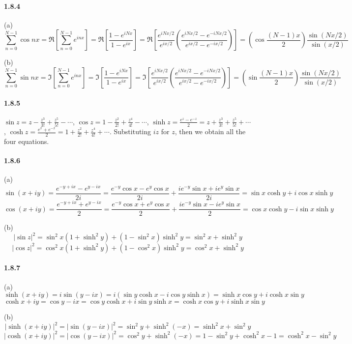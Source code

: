 \documentclass[a4paper]{article}
\begin{document}
\paragraph{1.8.4}
(a)
\[\sum_{n=0}^{N-1}\cos{nx}=\Re{\left[\sum_{n=0}^{N-1}e^{inx} \right]}=\Re{\left[\frac{1-e^{iNx}}{1-e^{ix}} \right]}=\Re{\left[\frac{e^{iNx/2}}{e^{ix/2}}\left(\frac{e^{iNx/2}-e^{-iNx/2}}{e^{ix/2}-e^{-ix/2}} \right) \right]}=\left(\cos{\frac{(N-1)x}{2}}\right)\frac{\sin{(Nx/2)}}{\sin{(x/2)}} \]

(b)
\[\sum_{n=0}^{N-1}\sin{nx}=\Im{\left[\sum_{n=0}^{N-1}e^{inx} \right]}=\Im{\left[\frac{1-e^{iNx}}{1-e^{ix}} \right]}=\Im{\left[\frac{e^{iNx/2}}{e^{ix/2}}\left(\frac{e^{iNx/2}-e^{-iNx/2}}{e^{ix/2}-e^{-ix/2}} \right) \right]}=\left(\sin{\frac{(N-1)x}{2}}\right)\frac{\sin{(Nx/2)}}{\sin{(x/2)}} \]

\paragraph{1.8.5}
$\sin{z}=z-\frac{z^3}{3!}+\frac{z^5}{5!}-\cdots$, $\cos{z}=1-\frac{z^2}{2!}+\frac{z^4}{4!}-\cdots$, $\sinh{z}=\frac{e^z-e^{-z}}{2}=z+\frac{z^3}{3!}+\frac{z^5}{5!}+\cdots$, $\cosh{z}=\frac{e^x+e^{-x}}{2}=1+\frac{z^2}{2!}+\frac{z^4}{4!}+\cdots$. Substituting $iz$ for $z$, then we obtain all the four equations. 

\paragraph{1.8.6}
(a)
\[\sin{(x+iy)}=\frac{e^{-y+ix}-e^{y-ix}}{2i}=\frac{e^{-y}\cos{x}-e^y\cos{x}}{2i}+\frac{ie^{-y}\sin{x}+ie^y\sin{x}}{2i}=\sin{x}\cosh{y}+i\cos{x}\sinh{y} \]
\[\cos{(x+iy)}=\frac{e^{-y+ix}+e^{y-ix}}{2}=\frac{e^{-y}\cos{x}+e^y\cos{x}}{2}+\frac{ie^{-y}\sin{x}-ie^y\sin{x}}{2}=\cos{x}\cosh{y}-i\sin{x}\sinh{y} \]

(b)
\[|\sin{z}|^2=\sin^2x(1+\sinh^2y)+(1-\sin^2x)\sinh^2y=\sin^2x+\sinh^2y\]
\[|\cos{z}|^2=\cos^2x(1+\sinh^2y)+(1-\cos^2x)\sinh^2y=\cos^2x+\sinh^2y\]

\paragraph{1.8.7}
(a)
\[\sinh{(x+iy)}=i\sin{(y-ix)}=i(\sin{y}\cosh{x}-i\cos{y}\sinh{x})=\sinh{x}\cos{y}+i\cosh{x}\sin{y}\]
\[\cosh{x+iy}=\cos{y-ix}=\cos{y}\cosh{x}+i\sin{y}\sinh{x}=\cosh{x}\cos{y}+i\sinh{x}\sin{y}\]

(b)
\[|\sinh{(x+iy)}|^2=|\sin{(y-ix)}|^2=\sin^2{y}+\sinh^2{(-x)}=\sinh^2{x}+\sin^2{y}\]
\[|\cosh{(x+iy)}|^2=|\cos{(y-ix)}|^2=\cos^2{y}+\sinh^2{(-x)}=1-\sin^2{y}+\cosh^2{x}-1=\cosh^2{x}-\sin^2{y}\]
\end{document}
